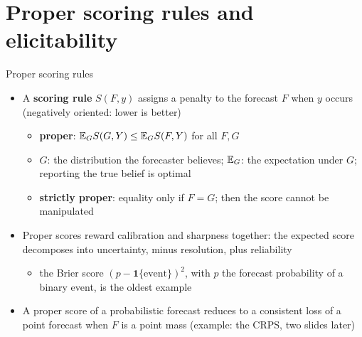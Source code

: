 \section{Proper scoring rules and elicitability}

\begin{frame}{Proper scoring rules}
\itemsize{\small}
\begin{itemize}
    \item A \textbf{scoring rule} $S(F, y)$ assigns a penalty to the forecast $F$ when $y$ occurs (negatively oriented: lower is better)
    \begin{itemize}
        \item \textbf{proper}: $\mathbb{E}_G S(G, Y) \le \mathbb{E}_G S(F, Y)$ for all $F, G$ 
        \item $G$: the distribution the forecaster believes; $\mathbb{E}_G$: the expectation under $G$; reporting the true belief is optimal
        \item \textbf{strictly proper}: equality only if $F = G$; then the score cannot be manipulated
    \end{itemize}
    \item Proper scores reward calibration and sharpness together: the expected score decomposes into uncertainty, minus resolution, plus reliability
    \begin{itemize}
        \item the Brier score $(p - \mathbf 1\{\text{event}\})^2$, with $p$ the forecast probability of a binary event, is the oldest example 
    \end{itemize}
    \item A proper score of a probabilistic forecast reduces to a consistent loss of a point forecast when $F$ is a point mass (example: the CRPS, two slides later)
\end{itemize}
\end{frame}

